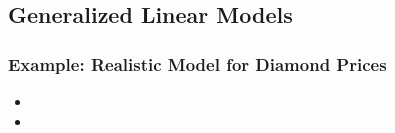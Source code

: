 \documentclass[
    utf8,
    aspectratio=169
]{beamer}  %
\begin{document}
\subsection{Generalized Linear Models}

\begin{frame}
\frametitle{Example: Realistic Model for Diamond Prices}
\begin{itemize}
	\item 
	\item
\end{itemize}
\end{frame}

\end{document}
